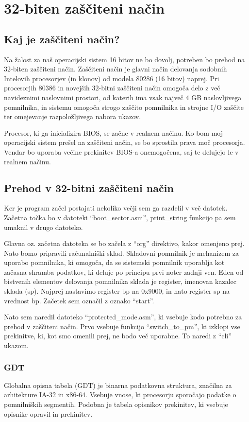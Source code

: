 \documentclass{report}
\begin{document}
\chapter{32-biten zaščiteni način}

\section{Kaj je zaščiteni način?}
Na žalost za naš operacijski sistem 16 bitov ne bo dovolj, potreben bo prehod na 32-biten zaščiteni način. Zaščiteni način je glavni način delovanja sodobnih Intelovih procesorjev (in klonov) od modela 80286 (16 bitov) naprej. Pri procesorjih 80386 in novejših 32-bitni zaščiteni način omogoča delo z več navideznimi naslovnimi prostori, od katerih ima vsak največ 4 GB naslovljivega pomnilnika, in sistemu omogoča strogo zaščito pomnilnika in strojne I/O zaščite ter omejevanje razpoložljivega nabora ukazov.

Procesor, ki ga inicializira BIOS, se začne v realnem načinu. Ko bom moj operacijski sistem prešel na zaščiteni način, se bo sprostila prava moč procesorja. Vendar bo uporaba večine prekinitev BIOS-a onemogočena, saj te delujejo le v realnem načinu.

\section{Prehod v 32-bitni zaščiteni način}
Ker je program začel postajati nekoliko večji sem ga razdelil v več datotek.
Začetna točka bo v datoteki ``boot\_sector.asm'', print\_string funkcijo pa sem umaknil v drugo datoteko.

Glavna oz. začetna datoteka se bo začela z ``org'' direktivo, kakor omenjeno
prej. Nato bomo pripravili računalniški sklad. Skladovni pomnilnik je mehanizem
za uporabo pomnilnika, ki omogoča, da se sistemski pomnilnik uporablja kot
začasna shramba podatkov, ki deluje po principu prvi-noter-zadnji ven. Eden od
bistvenih elementov delovanja pomnilnika sklada je register, imenovan kazalec
sklada (sp). Najprej nastavimo register bp na 0x9000, in nato register sp na
vrednost bp. Začetek sem označil z oznako ``start''.

Nato sem naredil datoteko ``protected\_mode.asm'', ki vsebuje kodo potrebno za
prehod v zaščiteni način. Prvo vsebuje funkcijo ``switch\_to\_pm'', ki izklopi
vse prekinitve, ki, kot smo omenili prej, ne bodo več uporabne. To naredi z
``cli'' ukazom.

\subsection*{GDT}
Globalna opisna tabela (GDT) je binarna podatkovna struktura, značilna za arhitekture IA-32 in x86-64. Vsebuje vnose, ki procesorju sporočajo podatke o pomnilniških segmentih. Podobna je tabela opisnikov prekinitev, ki vsebuje opisnike opravil in prekinitev.
\end{document}
